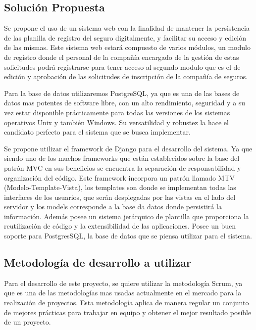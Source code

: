 \subsection{Solución Propuesta}
\setlength{\parskip}{5mm}
Se propone el uso de un sistema web con la finalidad de mantener la persistencia de las planilla de registro del seguro digitalmente, y facilitar su acceso y edición de las mismas. Este sistema web estará compuesto de varios módulos, un modulo de registro donde el personal de la compañía encargado de la gestión de estas solicitudes podrá registrarse para tener acceso al segundo modulo que es el de edición y aprobación de las solicitudes de inscripción de la compañía de seguros.

Para la base de datos utilizaremos PostgreSQL, ya que es una de las bases de datos mas potentes de software libre, con un alto rendimiento, seguridad y a su vez estar disponible prácticamente para todas las versiones de los sistemas operativos Unix y también Windows. Su versatilidad y robustez la hace el candidato perfecto para el sistema que se busca implementar.

Se propone utilizar el framework de Django para el desarrollo del sistema. Ya que siendo uno de los muchos frameworks que están establecidos sobre la base del patrón MVC en sus beneficios se encuentra la separación de responsabilidad y organización del código. Este framework incorpora un patrón llamado MTV (Modelo-Template-Vista), los templates son donde se implementan todas las interfaces de los usuarios, que serán desplegadas por las vistas en el lado del servidor y los models corresponde a la base da datos donde persistirá la información. Además posee un sistema jerárquico de plantilla que proporciona la reutilización de código y la extensibilidad de las aplicaciones. Posee un buen soporte para PostgresSQL, la base de datos que se piensa utilizar para el sistema. 

\setlength{\parskip}{0mm}



\subsection{Metodología de desarrollo a utilizar}


\setlength{\parskip}{5mm}
Para el desarrollo de este proyecto, se quiere utilizar la metodología Scrum, ya que es una de las metodologías mas usadas actualmente en el mercado para la realización de proyectos. Esta metodología aplica de manera regular un conjunto de mejores prácticas para trabajar en equipo y obtener el mejor resultado posible de un proyecto.

